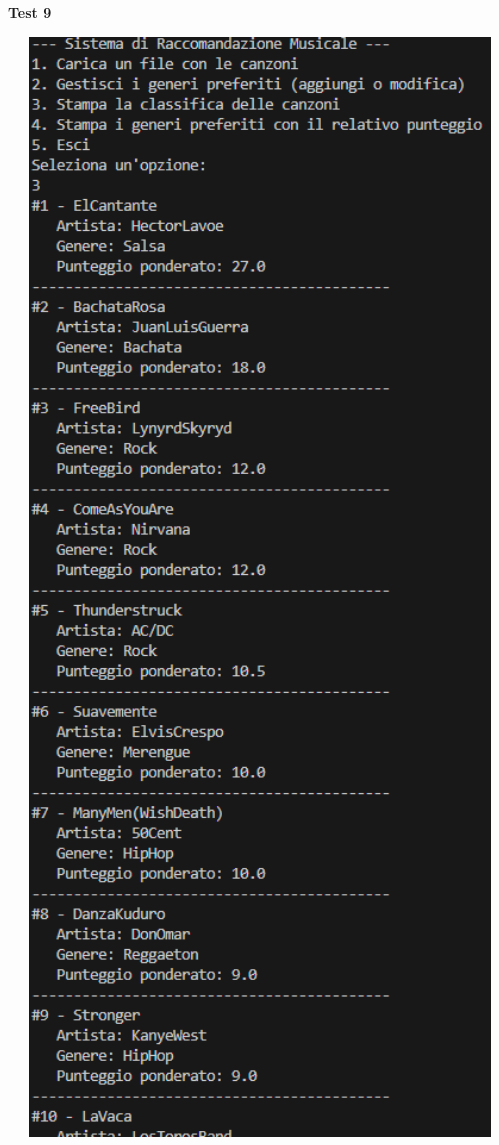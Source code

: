 \documentclass[a4paper,11pt]{article}
\begin{document}
\newpage
\begin{center}
    \textbf{Test 9}
    \par
    \vspace{0.5cm}
    \includegraphics[width=1\textwidth]{htest9}
\end{center}
\end{document}
